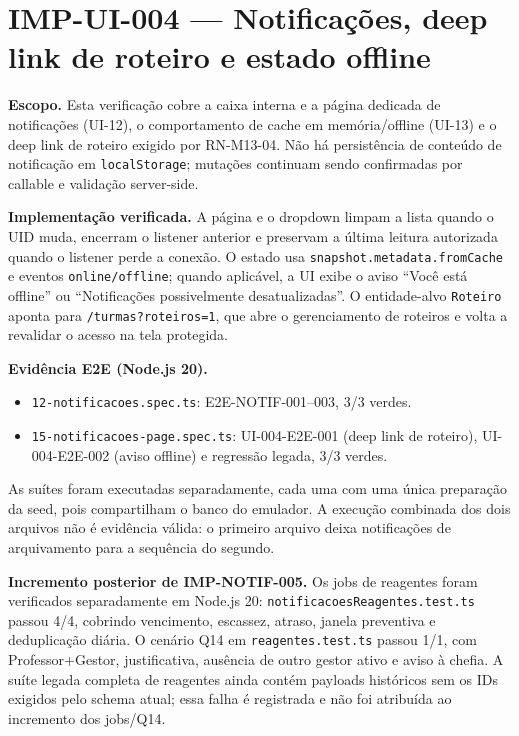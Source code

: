 \section{IMP-UI-004 — Notificações, deep link de roteiro e estado offline}

\textbf{Escopo.} Esta verificação cobre a caixa interna e a página dedicada de
notificações (UI-12), o comportamento de cache em memória/offline (UI-13) e o
deep link de roteiro exigido por RN-M13-04. Não há persistência de conteúdo de
notificação em \texttt{localStorage}; mutações continuam sendo confirmadas por
callable e validação server-side.

\textbf{Implementação verificada.} A página e o dropdown limpam a lista quando
o UID muda, encerram o listener anterior e preservam a última leitura autorizada
quando o listener perde a conexão. O estado usa \texttt{snapshot.metadata.fromCache}
e eventos \texttt{online/offline}; quando aplicável, a UI exibe o aviso
``Você está offline'' ou ``Notificações possivelmente desatualizadas''. O
entidade-alvo \texttt{Roteiro} aponta para
\texttt{/turmas?roteiros=1}, que abre o gerenciamento de roteiros e volta a
revalidar o acesso na tela protegida.

\textbf{Evidência E2E (Node.js 20).}

\begin{itemize}
  \item \texttt{12-notificacoes.spec.ts}: E2E-NOTIF-001--003, 3/3 verdes.
  \item \texttt{15-notificacoes-page.spec.ts}: UI-004-E2E-001 (deep link de
  roteiro), UI-004-E2E-002 (aviso offline) e regressão legada, 3/3 verdes.
\end{itemize}

As suítes foram executadas separadamente, cada uma com uma única preparação da
seed, pois compartilham o banco do emulador. A execução combinada dos dois
arquivos não é evidência válida: o primeiro arquivo deixa notificações de
arquivamento para a sequência do segundo.

\textbf{Incremento posterior de IMP-NOTIF-005.} Os jobs de reagentes foram
verificados separadamente em Node.js 20: \texttt{notificacoesReagentes.test.ts}
passou 4/4, cobrindo vencimento, escassez, atraso, janela preventiva e
deduplicação diária. O cenário Q14 em \texttt{reagentes.test.ts} passou 1/1,
com Professor+Gestor, justificativa, ausência de outro gestor ativo e aviso à
chefia. A suíte legada completa de reagentes ainda contém payloads históricos
sem os IDs exigidos pelo schema atual; essa falha é registrada e não foi
atribuída ao incremento dos jobs/Q14.
